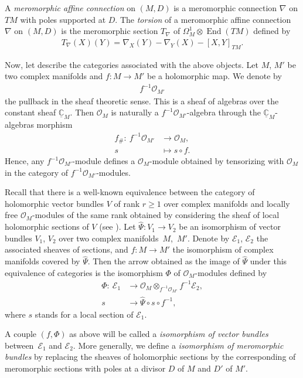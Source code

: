 \documentclass[10pt,a4paper]{amsart}
\numberwithin{equation}{section}
\begin{document}
A \textit{meromorphic affine connection} on $(M,D)$ is a meromorphic connection $\nabla$ on $TM$ with poles supported at $D$. The \textit{torsion} of a meromorphic affine connection $\nabla$ on $(M,D)$ is the meromorphic section $T_\nabla$ of $\Omega^1_M \otimes \operatorname{End}(TM)$ defined by
\begin{gather}\label{torsionaffine}
 T_\nabla(X)(Y) = \nabla_X(Y) - \nabla_Y(X) - [X,Y]_{TM}. \end{gather}

Now, let describe the categories associated with the above objects. Let $M$, $M'$ be two complex manifolds and $f\colon M\longrightarrow M'$ be a holomorphic map. We denote by \begin{gather*}%
 f^{-1}\mathcal{O}_{M'} \end{gather*}
 the pullback in the sheaf theoretic sense. This is a sheaf of algebras over the constant sheaf $\underline{\mathbb{C}}_M$. Then $\mathcal{O}_M$ is naturally a $f^{-1}\mathcal{O}_{M'}$-algebra through the $\underline{\mathbb{C}}_M$-algebras morphism
\begin{align*}%
f_\# \colon\ f^{-1}\mathcal{O}_{M'} & \longrightarrow \mathcal{O}_M,\nonumber \\
 s & \mapsto s\circ f.
\end{align*}
 Hence, any $f^{-1}\mathcal{O}_{M'}$-module defines a $\mathcal{O}_M$-module obtained by tensorizing with $\mathcal{O}_M$ in the category of $f^{-1}\mathcal{O}_{M'}$-modules.

Recall that there is a well-known equivalence between the category of holomorphic vector bundles $V$ of rank $r\geq 1$ over complex manifolds and locally free $\mathcal{O}_M$-modules of the same rank obtained by considering the sheaf of local holomorphic sections of $V$ (see \cite[Proposition~4.1]{Sabbah}). Let $\hat{\Psi}\colon V_1 \longrightarrow V_2$ be an isomorphism of vector bundles $V_1$, $V_2$ over two complex mani\-folds~$M$,~$M'$. Denote by $\mathcal{E}_1$, $\mathcal{E}_2$ the associated sheaves of sections, and $f\colon M \longrightarrow M'$ the isomorphism of complex manifolds covered by $\hat{\Psi}$. Then the arrow obtained as the image of $\hat{\Psi}$ under this equivalence of categories is the isomorphism $\Phi$ of $\mathcal{O}_M$-modules defined by
 \begin{align}
 \Phi \colon\ \mathcal{E}_1 & \longrightarrow \mathcal{O}_M\otimes_{f^{-1}\mathcal{O}_{M'}} f^{-1}\mathcal{E}_2,\nonumber\\
 s& \longrightarrow \hat{\Psi} \circ s \circ f^{-1},\label{isovector}
 \end{align}
 where $s$ stands for a local section of $\mathcal{E}_1$. \begin{Definition}\label{isovect}A couple $(f,\Phi)$ as above will be called a \textit{isomorphism of vector bundles} between~$\mathcal{E}_1$ and $\mathcal{E}_2$. More generally, we define a \textit{isomorphism of meromorphic bundles} by replacing the sheaves of holomorphic sections by the corresponding of meromorphic sections with poles at a divisor $D$ of $M$ and $D'$ of $M'$. \end{Definition}
\end{document}
